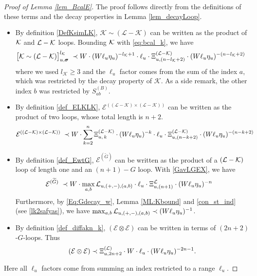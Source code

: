 \documentclass[10pt,reqno]{article}
\theoremstyle{plain} %
\theoremstyle{remark}
\numberwithin{equation}{section}
\begin{document}
 \begin{proof}[Proof of Lemma \ref{lem_BcalE}] The proof  follows directly from the definitions of these  terms  %
 and the decay properties in Lemma \ref{lem_decayLoop}.  
     \begin{itemize}
    \item By definition \eqref{DefKsimLK},  $\mathcal{K} \sim(\mathcal{L}-\mathcal{K})$ can be written as the product of $\cal K$  and $\cal L-\cal K$ loops.   Bounding  $\cal K$  with \eqref{eq:bcal_k}, we have  
    \begin{align}
    \big[\mathcal{K} \sim(\mathcal{L}-\mathcal{K})\big]_{u, \boldsymbol{\sigma}}^{l_{\mathcal{K}}}
 \; \prec \; &
 W\cdot (W\ell_u\eta_u)^{-l_{\mathcal{K}}+1}\cdot \ell_u\cdot \Xi^{(\cal L-\cal K)}_{u,(n-l_{\mathcal{K}}+2)}\cdot (W\ell_u\eta_u)^{-(n-l_{\mathcal{K}}+2)}
    \end{align}
    where we used $l_{\mathcal{K}}\ge 3$ and the $\ell_u$ factor comes from the sum of the index $a$, which was restricted by the decay property of $\mathcal K$. 
    As a side remark, the other index  $b$ was restricted by    $S^{(B)}_{ab}$. 
    
    \item By  definition \eqref{def_ELKLK},  $ \mathcal{E}^{((\mathcal{L} - \mathcal{K}) \times (\mathcal{L} - \mathcal{K}))}$ can be written as the product of two loops, whose total length is $n+2$.
    \begin{align}
   \mathcal{E}^{((\mathcal{L} - \mathcal{K}) \times (\mathcal{L} - \mathcal{K}))}
 \; \prec \; &
 W\cdot \sum_{k=2}^{n} \Xi^{(\cal L-\cal K)}_{u, \,k}
 \cdot (W\ell_u\eta_u)^{-k}
 \cdot \ell_u\cdot \Xi^{(\cal L-\cal K)}_{u,(n-k+2)}
 \cdot (W\ell_u\eta_u)^{-(n-k+2)}
      \end{align}
    
    \item By definition \eqref{def_EwtG}, 
    $\mathcal{E}^{(\widetilde{G})}$  can be written as the product of  a  $(\cal L-\cal K)$ loop of length one and an  $(n+1)-G$  loop. With  \eqref{GavLGEX}, we have 
    \begin{align}
  \mathcal{E}^{(\widetilde{G})}
 \; \prec \; &
 W\cdot   \max_{a,b}{\cal L}_{u,(+,-),(a,b)}
 \cdot \ell_u\cdot \Xi^{\cal L }_{u,(n+1)}
 \cdot (W\ell_u\eta_u)^{-n} 
    \end{align} 
    Furthermore, by \eqref{Eq:Gdecay_w}, Lemma \ref{ML:Kbound} and \eqref{con_st_ind} (see \eqref{lk2safyas}), we have $\max_{a,b}{\cal L}_{u,(+,-),(a,b)}\prec (W\ell_u\eta_u)^{-1}$. 
 \item By definition  \eqref{def_diffakn_k}, 
    $(\mathcal{E} \otimes \mathcal{E})$ can be written in terms of  $(2n+2)$-$G$-loops.  Thus 
    \begin{align}
(\mathcal{E} \otimes \mathcal{E}) \prec  \Xi^{(\cal L)}_{u, {2n+2}}\cdot  W\cdot\ell_u\cdot (W\ell_u\eta_u)^{-2n-1 } .
    \end{align} 
\end{itemize}
Here all  $\ell_u$ factors  come from summing an index restricted to a range $\ell_u$. 
 \end{proof}
  
\end{document}
